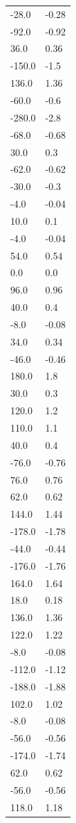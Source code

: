 \begin{longtable}{ll}
-28.0 & -0.28 \\
-92.0 & -0.92 \\
36.0 & 0.36 \\
-150.0 & -1.5 \\
136.0 & 1.36 \\
-60.0 & -0.6 \\
-280.0 & -2.8 \\
-68.0 & -0.68 \\
30.0 & 0.3 \\
-62.0 & -0.62 \\
-30.0 & -0.3 \\
-4.0 & -0.04 \\
10.0 & 0.1 \\
-4.0 & -0.04 \\
54.0 & 0.54 \\
0.0 & 0.0 \\
96.0 & 0.96 \\
40.0 & 0.4 \\
-8.0 & -0.08 \\
34.0 & 0.34 \\
-46.0 & -0.46 \\
180.0 & 1.8 \\
30.0 & 0.3 \\
120.0 & 1.2 \\
110.0 & 1.1 \\
40.0 & 0.4 \\
-76.0 & -0.76 \\
76.0 & 0.76 \\
62.0 & 0.62 \\
144.0 & 1.44 \\
-178.0 & -1.78 \\
-44.0 & -0.44 \\
-176.0 & -1.76 \\
164.0 & 1.64 \\
18.0 & 0.18 \\
136.0 & 1.36 \\
122.0 & 1.22 \\
-8.0 & -0.08 \\
-112.0 & -1.12 \\
-188.0 & -1.88 \\
102.0 & 1.02 \\
-8.0 & -0.08 \\
-56.0 & -0.56 \\
-174.0 & -1.74 \\
62.0 & 0.62 \\
-56.0 & -0.56 \\
118.0 & 1.18 \\

\end{longtable}
